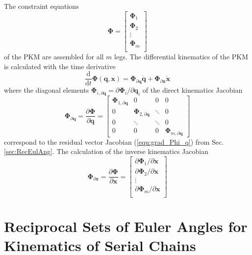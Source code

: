 \documentclass[robotics,article,submit,moreauthors,pdftex]{Definitions/mdpi}
\newcommand{\bm}[1]{\boldsymbol{#1}}
\begin{document}
The constraint equations
%
\begin{equation}
\bm{\Phi}
=
\begin{bmatrix}
\bm{\Phi}_1 \\
\bm{\Phi}_2 \\
\vdots \\
\bm{\Phi}_m \\
\end{bmatrix}
\end{equation}
%
of the PKM are assembled for all $m$ legs.
The differential kinematics of the PKM is calculated with the time derivative
%
\begin{equation}
\frac{\mathrm{d}}{{\mathrm{d}}t} \bm{\Phi}(\bm{q},\bm{x})
=
\bm{\Phi}_{\partial \bm{q}}  \dot{\bm{q}}
+
\bm{\Phi}_{\partial \bm{x}} \dot{\bm{x}}
\end{equation}
%
where the diagonal elements $\bm{\Phi}_{i,\partial \bm{q}}=\partial \bm{\Phi}_i / \partial \bm{q}_i$ of the direct kinematics Jacobian
%
\begin{equation}
\bm{\Phi}_{\partial \bm{q}}
=
\frac{\partial \bm{\Phi}}{\partial \bm{q}}
=
\begin{bmatrix}
\bm{\Phi}_{1,\partial \bm{q}}  & 0 & 0 & 0\\
0 & \bm{\Phi}_{2,\partial \bm{q}} & \ddots & 0  \\
0 & \ddots & \ddots & 0  \\
0 & 0 & 0 &\bm{\Phi}_{m,\partial \bm{q}}
\end{bmatrix}
\label{equ:PKM_phi_grad_q}
\end{equation}  
%
correspond to the residual vector Jacobian (\ref{equ:grad_Phi_q}) from Sec.\,\ref{sec:RecEulAng}.
The calculation of the inverse kinematics Jacobian
%
\begin{equation}
\bm{\Phi}_{\partial \bm{x}}
=
\frac{\partial \bm{\Phi}}{\partial \bm{x}}
=
\begin{bmatrix}
\partial \bm{\Phi}_1/\partial \bm{x}\\
\partial \bm{\Phi}_2/\partial \bm{x}\\
\vdots \\
\partial \bm{\Phi}_m/\partial \bm{x}\\
\end{bmatrix}
\label{equ:PKM_phi_grad_x}
\end{equation}

\section{Reciprocal Sets of Euler Angles for Kinematics of Serial Chains}
\label{sec:REW_seriell}
\end{document}
